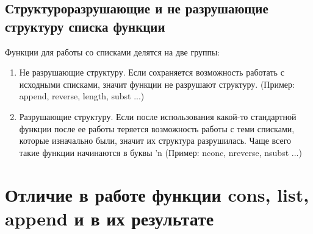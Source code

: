 \documentclass[a4paper,oneside,12pt]{extreport}
\begin{document}
\subsection*{Структуроразрушающие и не разрушающие структуру списка функции}

Функции для работы со списками делятся на две группы:

\begin{enumerate}
	\item Не разрушающие структуру. Если сохраняется возможность работать с исходными списками, значит функции не разрушают структуру.
	(Пример: append, reverse, length, subst ...)
	\item Разрушающие структуру. 
	Если после использования какой-то стандартной функции после ее работы теряется 
	возможность работы с теми списками, которые изначально были, значит их структура разрушилась. 
	Чаще всего такие функции начинаются в буквы 'n (Пример: nconc, nreverse, nsubst ...)
\end{enumerate}

\section*{Отличие в работе функции cons, list, append и в их результате}
\end{document}

